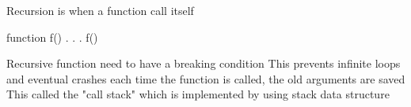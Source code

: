 Recursion 
  is when a function call itself

  function f() {
    . . . 
    f()
  }

  Recursive function need to have a breaking condition 
  This prevents infinite loops and eventual crashes 
  each time the function is called, the old arguments are saved 
  This called the "call stack" which is implemented by using stack data structure 
